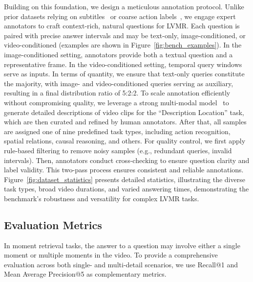 \documentclass{article}
\begin{document}
Building on this foundation, we design a meticulous annotation protocol. Unlike prior datasets relying on subtitles~\cite{lei2020tvr} or coarse action labels~\cite{THUMOS14,gao2017charadeSTA}, we engage expert annotators to craft context-rich, natural questions for LVMR. Each question is paired with precise answer intervals and may be text-only, image-conditioned, or video-conditioned (examples are shown in Figure~\ref{fig:bench_examples}). In the image-conditioned setting, annotators provide both a textual question and a representative frame. In the video-conditioned setting, temporal query windows serve as inputs. In terms of quantity, we ensure that text-only queries constitute the majority, with image- and video-conditioned queries serving as auxiliary, resulting in a final distribution ratio of 5:2:2. To scale annotation efficiently without compromising quality, we leverage a strong multi-modal model~\cite{qwen2vl} to generate detailed descriptions of video clips for the ``Description Location'' task, which are then curated and refined by human annotators. After that, all samples are assigned one of nine predefined task types, including action recognition, spatial relations, causal reasoning, and others. For quality control, we first apply rule-based filtering to remove noisy samples (e.g., redundant queries, invalid intervals). Then, annotators conduct cross-checking to ensure question clarity and label validity. This two-pass process ensures consistent and reliable annotations. Figure~\ref{fig:dataset_statistics} presents detailed statistics, illustrating the diverse task types, broad video durations, and varied answering times, demonstrating the benchmark's robustness and versatility for complex LVMR tasks.






\subsection{Evaluation Metrics}\label{sec:eval_metrics}
In moment retrieval tasks, the answer to a question may involve either a single moment or multiple moments in the video. To provide a comprehensive evaluation across both single- and multi-detail scenarios, we use Recall@1 and Mean Average Precision@5 as complementary metrics. 
\end{document}
